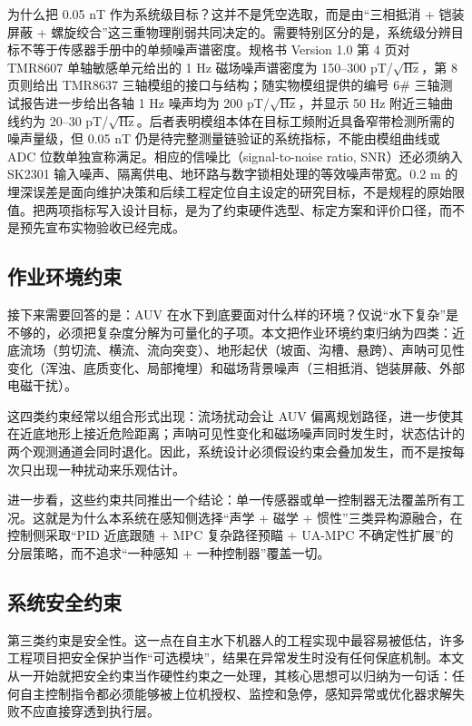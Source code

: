 为什么把 0.05 nT 作为系统级目标？这并不是凭空选取，而是由``三相抵消 + 铠装屏蔽 + 螺旋绞合''这三重物理削弱共同决定的。需要特别区分的是，系统级分辨目标不等于传感器手册中的单频噪声谱密度。规格书 Version 1.0 第 4 页对 TMR8607 单轴敏感单元给出的 1 Hz 磁场噪声谱密度为 150--300 pT/\(\sqrt{\text{Hz}}\)，第 8 页则给出 TMR8637 三轴模组的接口与结构\cite{multidimension2024tmr8607}；随实物模组提供的编号 6\# 三轴测试报告进一步给出各轴 1 Hz 噪声均为 200 pT/\(\sqrt{\text{Hz}}\)，并显示 50 Hz 附近三轴曲线约为 20--30 pT/\(\sqrt{\text{Hz}}\)。后者表明模组本体在目标工频附近具备窄带检测所需的噪声量级，但 0.05 nT 仍是待完整测量链验证的系统指标，不能由模组曲线或 ADC 位数单独宣称满足。相应的信噪比（signal-to-noise ratio, SNR）还必须纳入 SK2301 输入噪声、隔离供电、地环路与数字锁相处理的等效噪声带宽。0.2 m 的埋深误差是面向维护决策和后续工程定位自主设定的研究目标，不是规程的原始限值。把两项指标写入设计目标，是为了约束硬件选型、标定方案和评价口径，而不是预先宣布实物验收已经完成。

\subsection{作业环境约束}\label{sec:ch02-2-1-2}

接下来需要回答的是：AUV 在水下到底要面对什么样的环境？仅说``水下复杂''是不够的，必须把复杂度分解为可量化的子项。本文把作业环境约束归纳为四类：近底流场（剪切流、横流、流向突变）、地形起伏（坡面、沟槽、悬跨）、声呐可见性变化（浑浊、底质变化、局部掩埋）和磁场背景噪声（三相抵消、铠装屏蔽、外部电磁干扰）。

这四类约束经常以组合形式出现：流场扰动会让 AUV 偏离规划路径，进一步使其在近底地形上接近危险距离；声呐可见性变化和磁场噪声同时发生时，状态估计的两个观测通道会同时退化。因此，系统设计必须假设约束会叠加发生，而不是按每次只出现一种扰动来乐观估计。

进一步看，这些约束共同推出一个结论：单一传感器或单一控制器无法覆盖所有工况。这就是为什么本系统在感知侧选择``声学 + 磁学 + 惯性''三类异构源融合，在控制侧采取``PID 近底跟随 + MPC 复杂路径预瞄 + UA-MPC 不确定性扩展''的分层策略，而不追求``一种感知 + 一种控制器''覆盖一切。

\subsection{系统安全约束}\label{sec:ch02-2-1-3}

第三类约束是安全性。这一点在自主水下机器人的工程实现中最容易被低估，许多工程项目把安全保护当作``可选模块''，结果在异常发生时没有任何保底机制。本文从一开始就把安全约束当作硬性约束之一处理，其核心思想可以归纳为一句话：任何自主控制指令都必须能够被上位机授权、监控和急停，感知异常或优化器求解失败不应直接穿透到执行层。

